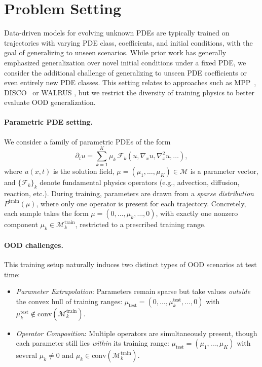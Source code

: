 \documentclass{article}
\theoremstyle{plain}
\theoremstyle{definition}
\theoremstyle{remark}
\begin{document}
\section{Problem Setting}
\label{sec:problem-setting}

Data-driven models for evolving unknown PDEs are typically trained on trajectories with varying PDE class, coefficients, and initial conditions, with the goal of generalizing to unseen scenarios. While prior work has generally emphasized generalization over novel initial conditions under a fixed PDE, we consider the additional challenge of generalizing to unseen PDE coefficients or even entirely new PDE classes. This setting relates to approaches such as MPP~\citep{mccabe2023multiple},  DISCO~\citep{morel2025disco} or WALRUS \citep{mccabe2025walrus}, but we restrict the diversity of training physics to better evaluate OOD generalization.


\paragraph{Parametric PDE setting.} 
We consider a family of parametric PDEs of the form
$$
\partial_t u = \sum_{k=1}^K \mu_k \, \mathcal{F}_k(u, \nabla_x u, \nabla^2_x u, \ldots),
$$
where $u(x,t)$ is the solution field, $\mu = (\mu_1, \ldots, \mu_K) \in \mathcal{M}$ is a parameter vector, and $\{\mathcal{F}_k\}_k$ denote fundamental physics operators (e.g., advection, diffusion, reaction, etc.). During training, parameters are drawn from a \textit{sparse distribution} $P^{\text{train}}(\mu)$, where only one operator is 
present for each trajectory. Concretely, each sample takes the form 
$\mu = (0, \ldots, \mu_k, \ldots, 0)$,
with exactly one nonzero component $\mu_k \in \mathcal{M}_k^{\text{train}}$, restricted to a prescribed training range.


\paragraph{OOD challenges.} 
This training setup naturally induces two distinct types of OOD 
scenarios at test time:
\begin{itemize}
\item \textit{Parameter Extrapolation}: Parameters remain sparse but take values \textit{outside} the convex hull of training ranges:
$\mu_{\text{test}} = (0, \ldots, \mu_k^{\text{test}}, \ldots, 0)$ 
with $\mu_k^{\text{test}} \notin \text{conv}(\mathcal{M}_k^{\text{train}})$.

\item \textit{Operator Composition}: Multiple operators are simultaneously 
present, 
though each parameter still lies \textit{within} its training range:
$\mu_\text{test} = (\mu_1, \ldots, \mu_K)$ with several $\mu_k \neq 0$ and $\mu_k \in \text{conv}(\mathcal{M}_k^{\text{train}})$.
\end{itemize}
\end{document}

